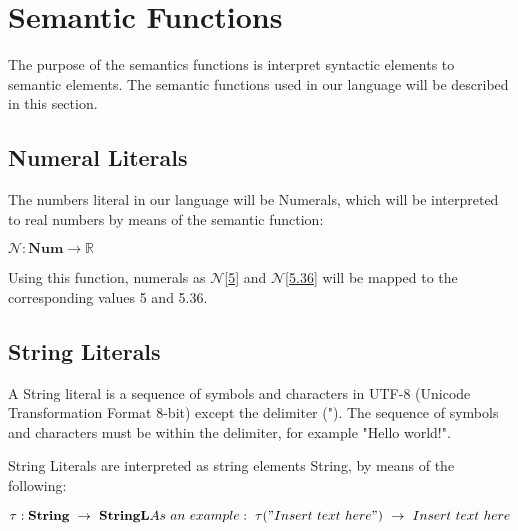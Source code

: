  \section{Semantic Functions}
 The purpose of the semantics functions is interpret syntactic elements to semantic elements. The semantic functions used in our language will be described in this section. 
  
  \subsection{Numeral Literals}
  The numbers literal in our language will be Numerals, which will be interpreted to real numbers by means of the semantic function: 
  
  \begin{math}
  \mathcal{N}: \textbf{Num} \rightarrow \mathbb{R}
  \end{math}
  
  Using this function, numerals as 
  \begin{math}
    \mathcal{N}
  \end{math}[\underline{5}] and 
  \begin{math}
    \mathcal{N}
  \end{math}[\underline{5.36}] will be mapped to the corresponding values 5 and 5.36. 
  
  
  \subsection{String Literals}
  A String literal is a sequence of symbols and characters in UTF-8 (Unicode Transformation Format 8-bit) except the delimiter ("). The sequence of symbols and characters must be within the delimiter, for example "Hello world!". 
  
  
  String Literals are interpreted as string elements String, by means of the following:
  
  \begin{math}
  	\tau : \textbf{String} \ \rightarrow \ \textbf{StringL} \newline
  	As \ an \ example: \ \tau("Insert \ text \ here") \ \rightarrow \ Insert \ text \ here
  \end{math}
  
